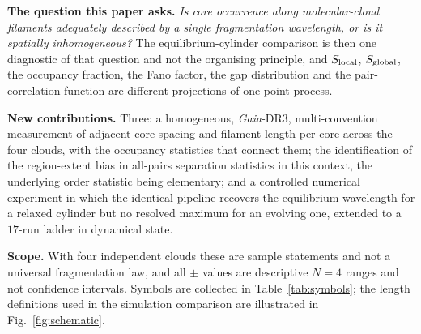 \documentclass[usenatbib,twoside,twocolumn]{mnras}
\begin{document}
\smallskip\noindent\textbf{The question this paper asks.} \emph{Is core occurrence along molecular-cloud filaments adequately described by a single fragmentation wavelength, or is it spatially inhomogeneous?} The equilibrium-cylinder comparison is then one diagnostic of that question and not the organising principle, and $S_{\rm local}$, $S_{\rm global}$, the occupancy fraction, the Fano factor, the gap distribution and the pair-correlation function are different projections of one point process.

\smallskip\noindent\textbf{New contributions.} Three: a homogeneous, \textit{Gaia}-DR3, multi-convention measurement of adjacent-core spacing and filament length per core across the four clouds, with the occupancy statistics that connect them; the identification of the region-extent bias in all-pairs separation statistics in this context, the underlying order statistic being elementary; and a controlled numerical experiment in which the identical pipeline recovers the equilibrium wavelength for a relaxed cylinder but no resolved maximum for an evolving one, extended to a $17$-run ladder in dynamical state.

\smallskip\noindent\textbf{Scope.} With four independent clouds these are sample statements and not a universal fragmentation law, and all $\pm$ values are descriptive $N=4$ ranges and not confidence intervals. Symbols are collected in Table~\ref{tab:symbols}; the length definitions used in the simulation comparison are illustrated in Fig.~\ref{fig:schematic}.
\end{document}
